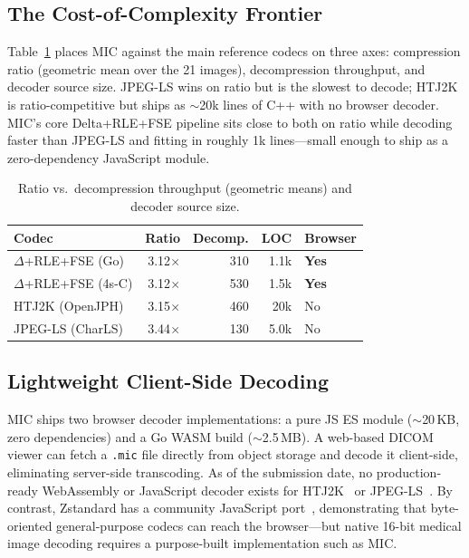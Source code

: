 \documentclass[journal]{IEEEtran}
\begin{document}
\subsection{The Cost-of-Complexity Frontier}

Table~\ref{tab:pareto} places MIC against the main reference codecs on three
axes: compression ratio (geometric mean over the 21 images), decompression
throughput, and decoder source size. JPEG-LS wins on ratio but is the
slowest to decode; HTJ2K is ratio-competitive but ships as
${\sim}$20k lines of C++ with no browser decoder. MIC's core Delta+RLE+FSE
pipeline sits close to both on ratio while decoding faster than JPEG-LS and
fitting in roughly 1k lines---small enough to ship as a zero-dependency
JavaScript module.

\begin{table}[tbp]
\centering
\caption{Ratio vs.\ decompression throughput (geometric means) and decoder
source size.}
\label{tab:pareto}
\scriptsize
\begin{tabular}{lrrrp{1.2cm}}
\toprule
Codec & Ratio & Decomp. & LOC & Browser \\
\midrule
$\Delta$+RLE+FSE (Go) & 3.12$\times$ & 310 & 1.1k & \textbf{Yes} \\
$\Delta$+RLE+FSE (4s-C) & 3.12$\times$ & 530 & 1.5k & \textbf{Yes} \\
HTJ2K (OpenJPH) & 3.15$\times$ & 460 & 20k & No \\
JPEG-LS (CharLS) & 3.44$\times$ & 130 & 5.0k & No \\
\bottomrule
\end{tabular}
\end{table}

\subsection{Lightweight Client-Side Decoding}

MIC ships two browser decoder implementations: a pure JS ES module
(${\sim}$20\,KB, zero dependencies) and a Go WASM build (${\sim}$2.5\,MB). A
web-based DICOM viewer can fetch a \texttt{.mic} file directly from object
storage and decode it client-side, eliminating server-side transcoding. As of
the submission date, no production-ready WebAssembly or JavaScript decoder exists
for HTJ2K~\cite{nohtj2k} or JPEG-LS~\cite{charls}. By contrast, Zstandard has a
community JavaScript port~\cite{fzstd}, demonstrating that byte-oriented
general-purpose codecs can reach the browser---but native 16-bit medical image
decoding requires a purpose-built implementation such as MIC.
\end{document}
